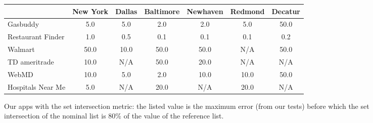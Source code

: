 \begin{figure*}
 \small
 \centering
 \begin{tabular}{|l||c|c|c|c|c|c|}
 \hline
 & New York & Dallas & Baltimore & Newhaven & Redmond & Decatur \\
 \hline
 \hline
 Gasbuddy & 5.0 & 5.0 & 2.0 & 2.0 & 5.0 & 50.0 \\
\hline
Restaurant Finder & 1.0 & 0.5 & 0.1 & 0.1 & 0.1 & 0.2 \\
\hline
Walmart & 50.0 & 10.0 & 50.0 & 50.0 & N/A & 50.0 \\
\hline
TD ameritrade & 10.0 & N/A & 50.0 & 20.0 & N/A & N/A \\
\hline
WebMD & 10.0 & 5.0 & 2.0 & 10.0 & 10.0 & 50.0 \\
\hline
Hospitals Near Me & 5.0 & N/A & 20.0 & N/A & 20.0 & N/A \\
\hline

\end{tabular}
 \caption{Our apps with the set intersection metric: the listed value is the maximum error
(from our tests) before which the set intersection of the nominal list is 80\% of the value of the reference list.}
 \label{fig:knee-points-set-cutoff}
\end{figure*}

